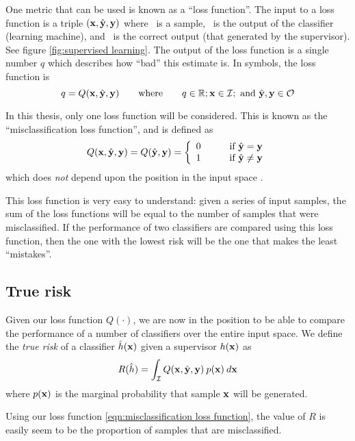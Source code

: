 One metric that can be used is known as a ``loss function''.  The
input to a loss function is a triple
$(\mathbf{x}, \hat{\mathbf{y}}, \mathbf{y})$ where \bfx\ is a sample, \bfyh\ is the
output of the classifier (learning machine), and \bfy\ is the correct output (that generated by the supervisor).  See figure \ref{fig:supervised
learning}.  The output of the loss function is a single number $q$
which describes how ``bad'' this estimate is.  In symbols, the loss
function is
%
\begin{equation}
q = Q(\mathbf{x}, \hat{\mathbf{y}}, \mathbf{y}) \qquad \mbox{where} \qquad q \in \mathbb{R};
\mathbf{x} \in \mathcal{I}; \mbox{ and }\hat{\mathbf{y}}, \mathbf{y} \in \mathcal{O}
\end{equation}
%

In this thesis, only one loss function will be considered.  This is
known as the ``misclassification loss function'', and is defined as
%
\begin{equation}
Q(\mathbf{x}, \hat{\mathbf{y}}, \mathbf{y}) = Q(\hat{\mathbf{y}}, \mathbf{y}) = \left\{
\begin{array}{ll}
	0	&	\qquad \mbox{if $\hat{\mathbf{y}} = \mathbf{y}$} \\
	1	&	\qquad \mbox{if $\hat{\mathbf{y}} \neq \mathbf{y}$}
\end{array}
\right.
\label{eqn:misclassification loss function}
\end{equation}
%
which does \emph{not} depend upon the position in the input space \bfx.

This loss function is very easy to understand: given a series of input
samples, the sum of the loss functions will be equal to the number of
samples that were misclassified.  If the performance of two
classifiers are compared using this loss function, then the one with
the lowest risk will be the one that makes the least ``mistakes''.


\subsection{True risk}
Given our loss function $Q(\cdot)$, we are now in the position to be
able to compare the performance of a number of classifiers over the
entire input space.  We define the \emph{true risk} of a classifier
$\hat{h}(\mathbf{x})$ given a supervisor $h(\mathbf{x})$ as
%
\begin{equation}
R(\hat{h}) = \int_{\mathcal{I}} Q(\mathbf{x}, \hat{\mathbf{y}}, \mathbf{y}) \: p(\mathbf{x}) \: d\mathbf{x}
\label{eqn:true risk}
\end{equation}
%
where $p(\mathbf{x})$ is the marginal probability that sample $\mathbf{x}$ will be
generated.

Using our loss function \ref{eqn:misclassification loss function}, the
value of $R$ is easily seem to be the proportion of samples that are
misclassified.


